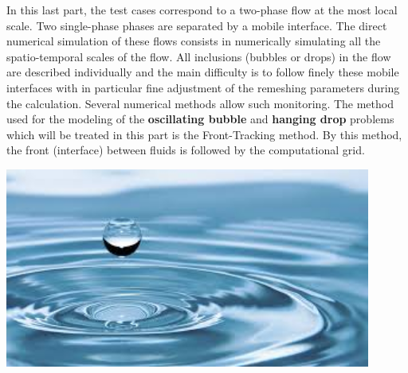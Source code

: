In this last part, the test cases correspond to a two-phase flow at the most local scale.\newline
Two single-phase phases are separated by a mobile interface. The direct numerical simulation of these flows consists in numerically simulating all the spatio-temporal scales of the flow.
All inclusions (bubbles or drops) in the flow are described individually and the main difficulty is to follow finely these mobile interfaces with in particular fine adjustment of the remeshing 
parameters during the calculation. \medskip \newline
Several numerical methods allow such monitoring. The method used for the modeling of the \textbf{oscillating bubble} and \textbf{hanging drop} problems which will be treated in this part is the Front-Tracking method.
By this method, the front (interface) between fluids is followed by the computational grid.\medskip \bigskip  \newline
\begin{center}\includegraphics[width=12cm]{tools/goutte.png}\end{center}
